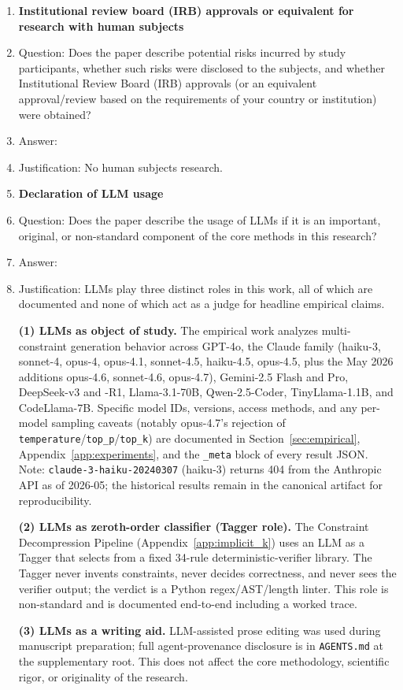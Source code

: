 \begin{enumerate}
\item {\bf Institutional review board (IRB) approvals or equivalent for research with human subjects}
    \item[] Question: Does the paper describe potential risks incurred by study participants, whether such risks were disclosed to the subjects, and whether Institutional Review Board (IRB) approvals (or an equivalent approval/review based on the requirements of your country or institution) were obtained?
    \item[] Answer: \answerNA{}
    \item[] Justification: No human subjects research.

\item {\bf Declaration of LLM usage}
    \item[] Question: Does the paper describe the usage of LLMs if it is an important, original, or non-standard component of the core methods in this research?
    \item[] Answer: \answerYes{}
    \item[] Justification: LLMs play three distinct roles in this work, all of which are documented and none of which act as a judge for headline empirical claims.

    \textbf{(1) LLMs as object of study.} The empirical work analyzes multi-constraint generation behavior across GPT-4o, the Claude family (haiku-3, sonnet-4, opus-4, opus-4.1, sonnet-4.5, haiku-4.5, opus-4.5, plus the May 2026 additions opus-4.6, sonnet-4.6, opus-4.7), Gemini-2.5 Flash and Pro, DeepSeek-v3 and -R1, Llama-3.1-70B, Qwen-2.5-Coder, TinyLlama-1.1B, and CodeLlama-7B. Specific model IDs, versions, access methods, and any per-model sampling caveats (notably opus-4.7's rejection of \texttt{temperature}/\texttt{top\_p}/\texttt{top\_k}) are documented in Section~\ref{sec:empirical}, Appendix~\ref{app:experiments}, and the \texttt{\_meta} block of every result JSON. Note: \texttt{claude-3-haiku-20240307} (haiku-3) returns 404 from the Anthropic API as of 2026-05; the historical results remain in the canonical artifact for reproducibility.

    \textbf{(2) LLMs as zeroth-order classifier (Tagger role).} The Constraint Decompression Pipeline (Appendix~\ref{app:implicit_k}) uses an LLM as a Tagger that selects from a fixed 34-rule deterministic-verifier library. The Tagger never invents constraints, never decides correctness, and never sees the verifier output; the verdict is a Python regex/AST/length linter. This role is non-standard and is documented end-to-end including a worked trace.

    \textbf{(3) LLMs as a writing aid.} LLM-assisted prose editing was used during manuscript preparation; full agent-provenance disclosure is in \texttt{AGENTS.md} at the supplementary root. This does not affect the core methodology, scientific rigor, or originality of the research.

\end{enumerate}
